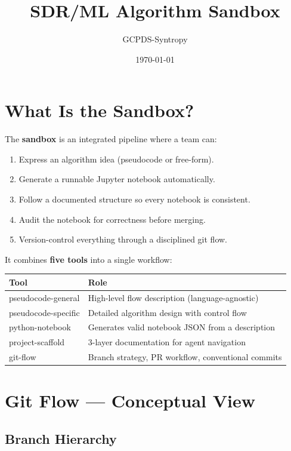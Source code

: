 \documentclass[11pt]{article}
\title{SDR/ML Algorithm Sandbox}
\author{GCPDS-Syntropy}
\date{\today}
\begin{document}
\maketitle

\section*{What Is the Sandbox?}

The \textbf{sandbox} is an integrated pipeline where a team can:
\begin{enumerate}
  \item Express an algorithm idea (pseudocode or free-form).
  \item Generate a runnable Jupyter notebook automatically.
  \item Follow a documented structure so every notebook is consistent.
  \item Audit the notebook for correctness before merging.
  \item Version-control everything through a disciplined git flow.
\end{enumerate}

It combines \textbf{five tools} into a single workflow:

\begin{longtable}{ll}
\toprule
\textbf{Tool} & \textbf{Role} \\
\midrule
\endhead
pseudocode-general & High-level flow description (language-agnostic) \\
pseudocode-specific & Detailed algorithm design with control flow \\
python-notebook & Generates valid notebook JSON from a description \\
project-scaffold & 3-layer documentation for agent navigation \\
git-flow & Branch strategy, PR workflow, conventional commits \\
\bottomrule
\end{longtable}

\section*{Git Flow --- Conceptual View}

\subsection*{Branch Hierarchy}
\end{document}
